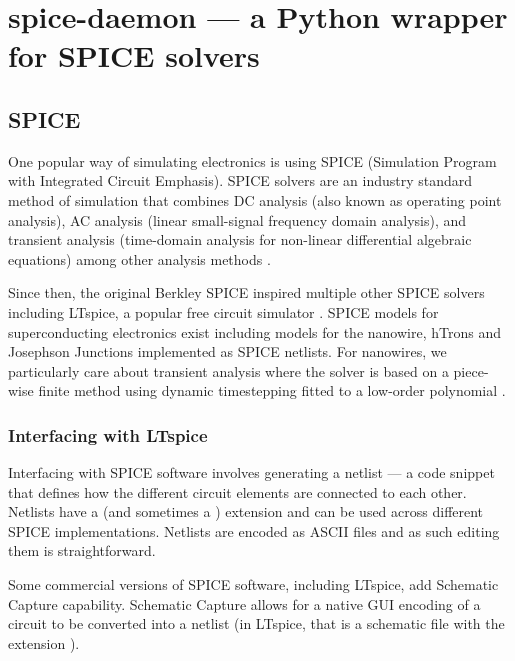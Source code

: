 \section{spice-daemon --- a Python wrapper for SPICE solvers}




\subsection{SPICE}

One popular way of simulating electronics is using SPICE 
(Simulation Program with Integrated Circuit Emphasis). 
SPICE solvers are an industry standard method of simulation that combines DC analysis (also known as
operating point analysis), AC analysis (linear small-signal frequency domain analysis), and 
transient analysis (time-domain analysis for non-linear differential algebraic equations)
among other analysis methods \cite{spice-og}.

Since then, the original Berkley SPICE
inspired multiple other SPICE solvers including LTspice, a popular free circuit simulator \cite{ltspice-diff-post}. SPICE models for 
superconducting electronics exist including models for the nanowire,
hTrons and Josephson Junctions implemented as SPICE netlists. For nanowires, we
particularly care about transient analysis where the solver
is based on a piece-wise finite method using dynamic timestepping fitted to a 
low-order polynomial \cite{spice-book}.

\subsubsection{Interfacing with LTspice}%
\label{interfacing_with_ltspice}

Interfacing with SPICE software involves generating a netlist --- a code snippet that defines
how the different circuit elements are connected to each other. Netlists have a  (and 
sometimes a ) extension and can be used across different SPICE implementations. 
Netlists are encoded as ASCII files and as such editing them is straightforward.

Some commercial versions of SPICE
software, including LTspice, add Schematic Capture capability. Schematic Capture allows for a
native GUI encoding of a circuit to be converted into a netlist (in LTspice, that is a 
schematic file with the extension ).

